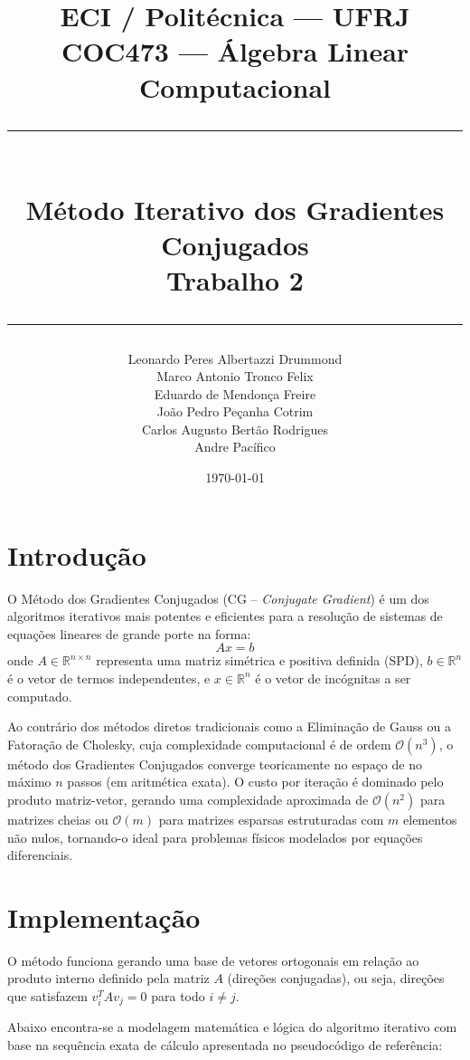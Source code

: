 \documentclass[12pt,a4paper]{article}
\title{
  \vspace{-1cm}
  {\large ECI / Politécnica — UFRJ} \\[0.4em]
  {\large COC473 — Álgebra Linear Computacional} \\[0.8em]
  \rule{\linewidth}{0.5pt} \\[0.6em]
  {\LARGE \textbf{Método Iterativo dos
Gradientes Conjugados}} \\[0.4em]
  {\large Trabalho 2} \\[0.2em]
  \rule{\linewidth}{0.5pt}
}
\author{
  Leonardo Peres Albertazzi Drummond \\
  Marco Antonio Tronco Felix \\
  Eduardo de Mendonça Freire \\
  João Pedro Peçanha Cotrim \\
  Carlos Augusto Bertão Rodrigues \\
  Andre Pacífico
}
\date{\today}
\begin{document}
\maketitle

\section{Introdução}
O Método dos Gradientes Conjugados (CG -- \textit{Conjugate Gradient}) é um dos algoritmos iterativos mais potentes e eficientes para a resolução de sistemas de equações lineares de grande porte na forma:
\begin{equation}
    A x = b
\end{equation}
onde $A \in \mathbb{R}^{n \times n}$ representa uma matriz simétrica e positiva definida (SPD), $b \in \mathbb{R}^n$ é o vetor de termos independentes, e $x \in \mathbb{R}^n$ é o vetor de incógnitas a ser computado.

Ao contrário dos métodos diretos tradicionais como a Eliminação de Gauss ou a Fatoração de Cholesky, cuja complexidade computacional é de ordem $\mathcal{O}(n^3)$, o método dos Gradientes Conjugados converge teoricamente no espaço de no máximo $n$ passos (em aritmética exata). O custo por iteração é dominado pelo produto matriz-vetor, gerando uma complexidade aproximada de $\mathcal{O}(n^2)$ para matrizes cheias ou $\mathcal{O}(m)$ para matrizes esparsas estruturadas com $m$ elementos não nulos, tornando-o ideal para problemas físicos modelados por equações diferenciais.

\section{Implementação}
O método funciona gerando uma base de vetores ortogonais em relação ao produto interno definido pela matriz $A$ (direções conjugadas), ou seja, direções que satisfazem $v_i^T A v_j = 0$ para todo $i \neq j$. 

Abaixo encontra-se a modelagem matemática e lógica do algoritmo iterativo com base na sequência exata de cálculo apresentada no pseudocódigo de referência:
\end{document}
